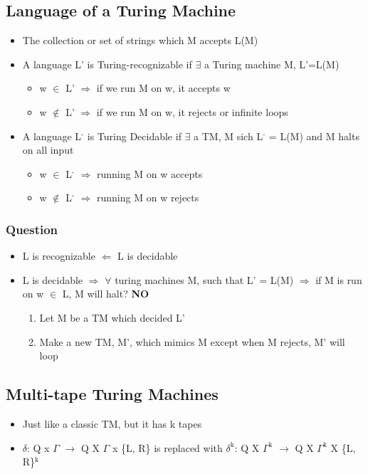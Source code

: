 \documentclass[11pt]{article}
\begin{document}
\subsection{Language of a Turing Machine}
\label{sec:org8cfeb7c}
\begin{itemize}
\item The collection or set of strings which M accepts L(M)
\item A language L' is Turing-recognizable if \(\exists\) a Turing machine M, L'=L(M)
\begin{itemize}
\item w \(\in\) L' \(\Rightarrow\) if we run M on w, it accepts w
\item w \(\notin\) L' \(\Rightarrow\) if we run M on w, it rejects or infinite loops
\end{itemize}
\item A language L\(^{\text{-}}\) is Turing Decidable if \(\exists\) a TM, M sich L\(^{\text{-}}\) = L(M) and M halts on all input
\begin{itemize}
\item w \(\in\) L\(^{\text{-}}\) \(\Rightarrow\) running M on w accepts
\item w \(\notin\) L\(^{\text{-}}\) \(\Rightarrow\) running M on w rejects
\end{itemize}
\end{itemize}
\subsubsection{Question}
\label{sec:orgc2bdd9c}
\begin{itemize}
\item L is recognizable \(\Leftarrow\) L is decidable
\item L is decidable \(\Rightarrow\) \(\forall\) turing machines M, such that L' = L(M) \(\Rightarrow\) if M is run on w \(\in\) L, M will halt? \textbf{NO}
\begin{enumerate}
\item Let M be a TM which decided L'
\item Make a new TM, M', which mimics M except when M rejects, M' will loop
\end{enumerate}
\end{itemize}
\subsection{Multi-tape Turing Machines}
\label{sec:org0628775}
\begin{itemize}
\item Just like a classic TM, but it has k tapes
\item \(\delta\): Q x \(\Gamma\) \(\rightarrow\) Q X \(\Gamma\) x \{L, R\} is replaced with \(\delta^{\text{k}}\): Q X \(\Gamma^{\text{k}}\) \(\rightarrow\) Q X \(\Gamma^{\text{k}}\) X \{L, R\}\(^{\text{k}}\)
\end{itemize}
\end{document}
